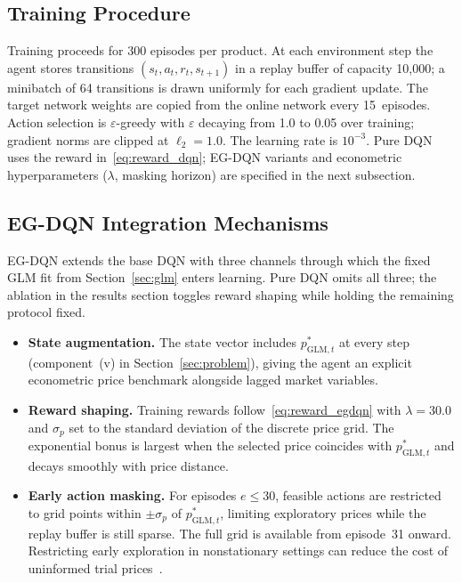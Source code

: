 \documentclass[journal, 10pt, twoside]{IEEEtran}
\begin{document}
\subsection{Training Procedure}

Training proceeds for 300 episodes per product.
At each environment step the agent stores transitions
$(s_t,a_t,r_t,s_{t+1})$ in a replay buffer of capacity 10{,}000; a
minibatch of 64 transitions is drawn uniformly for each gradient
update.
The target network weights are copied from the online network every
15~episodes.
Action selection is $\varepsilon$-greedy with $\varepsilon$ decaying
from 1.0 to 0.05 over training; gradient norms are clipped at
$\ell_2=1.0$.
The learning rate is $10^{-3}$.
Pure DQN uses the reward in~\eqref{eq:reward_dqn}; EG-DQN variants
and econometric hyperparameters ($\lambda$, masking horizon) are
specified in the next subsection.

\subsection{EG-DQN Integration Mechanisms}

EG-DQN extends the base DQN with three channels through which the
fixed GLM fit from Section~\ref{sec:glm} enters learning.
Pure DQN omits all three; the ablation in the results section toggles
reward shaping while holding the remaining protocol fixed.

\begin{itemize}
  \item \textbf{State augmentation.}
    The state vector includes $p^*_{\text{GLM},t}$ at every step
    (component~(v) in Section~\ref{sec:problem}), giving the agent an
    explicit econometric price benchmark alongside lagged market
    variables.
  \item \textbf{Reward shaping.}
    Training rewards follow~\eqref{eq:reward_egdqn} with
    $\lambda=30.0$ and $\sigma_p$ set to the standard deviation of the
    discrete price grid.
    The exponential bonus is largest when the selected price coincides
    with $p^*_{\text{GLM},t}$ and decays smoothly with price distance.
  \item \textbf{Early action masking.}
    For episodes $e \le 30$, feasible actions are restricted to grid
    points within $\pm\sigma_p$ of $p^*_{\text{GLM},t}$, limiting
    exploratory prices while the replay buffer is still sparse.
    The full grid is available from episode~31 onward.
    Restricting early exploration in nonstationary settings can reduce
    the cost of uninformed trial prices~\cite{cheung2023}.
\end{itemize}
\end{document}
